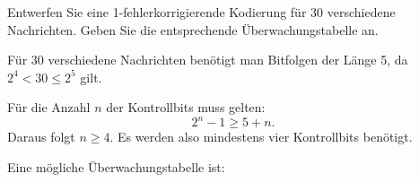 \begin{myexercise}

    Entwerfen Sie eine 1-fehlerkorrigierende Kodierung für
    30 verschiedene Nachrichten. Geben Sie die entsprechende
    Überwachungstabelle an.
    \begin{myanswer}

        Für 30 verschiedene Nachrichten benötigt man Bitfolgen der Länge 5,
        da \(2^4 < 30 \leq 2^5\) gilt.

        Für die Anzahl \(n\) der Kontrollbits muss gelten:
        \[
            2^n-1 \geq 5+n.
        \]
        Daraus folgt \(n\geq 4\). Es werden also mindestens
        vier Kontrollbits benötigt.

        Eine mögliche Überwachungstabelle ist:

        \begin{center}
\end{center}
\end{myanswer}
\end{myexercise}
